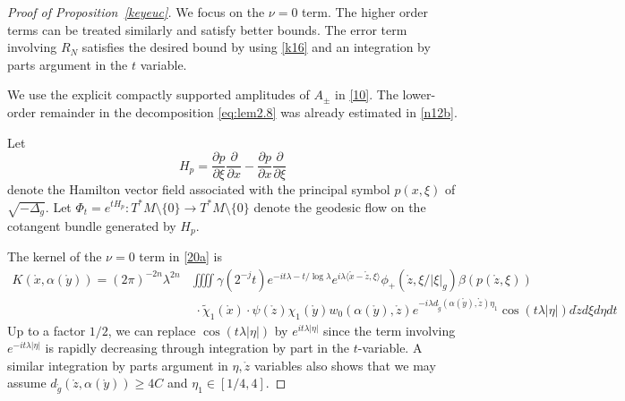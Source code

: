 \documentclass[11pt]{amsart}
\newcommand{\la}{\lambda}
\begin{document}
\begin{proof}[Proof of Proposition~\ref{keyeuc}]
We focus on the $\nu=0$ term. The higher order terms can be treated similarly and satisfy better bounds. The error term involving $R_N$ satisfies the desired bound by using  \eqref{k16} and an integration by parts argument in the $t$ variable.


We use the explicit compactly supported amplitudes of $A_\pm$ in \eqref{10}. The lower-order remainder in the decomposition \eqref{eq:lem2.8} was already estimated in \eqref{n12b}.

Let $$H_p=\frac{\partial p}{\partial \xi}\frac{\partial }{\partial x}-\frac{\partial p}{\partial x}\frac{\partial }{\partial \xi}$$ denote the Hamilton vector field associated with the principal symbol $p(x,\xi)$ of $\sqrt{-\Delta_g}$.
Let $\Phi_t=e^{tH_p}: {T^*M\setminus \{0\}\to T^*M\setminus \{0\}}$ denote the geodesic flow on the cotangent bundle generated by $H_p$.

The kernel of the $\nu=0$ term in \eqref{20a} is 
\begin{equation}\label{mk}
     \begin{aligned}
        K(\mathring x,\alpha(\mathring y))=(2\pi)^{-2n}\la^{2n}&\iiiint \gamma(2^{-j}t)e^{-it\la-t/\log\la} e^{i\la\langle \mathring x-\mathring z,\xi \rangle} \phi_+(\mathring z,\xi/|\xi|_g)\beta(p(\mathring z,\xi))\\        &\,\,\cdot\tilde\chi_1(\mathring x)
        \cdot\psi(\mathring z)\chi_1(\mathring y)w_0(\alpha(\mathring y),\mathring z) e^{-i\la d_{\mathring g}(\alpha(\mathring y), \mathring z)\eta_1} \cos (t\la|\eta|) d\mathring zd\xi d\eta dt    \end{aligned}\end{equation}
 Up to a factor $1/2$, we can replace $\cos(t\la|\eta|)$ by $e^{it\la|\eta|}$ since the term involving $e^{-it\la|\eta|}$ is rapidly decreasing through integration by part in the $t$-variable. A similar integration by parts argument in $\eta, \mathring z$ variables also shows that we may assume  $d_{\mathring g}(\mathring z, \alpha(\mathring y))\ge 4C$ and $\eta_1\in [1/4,4]$.


\end{proof}
\end{document}

